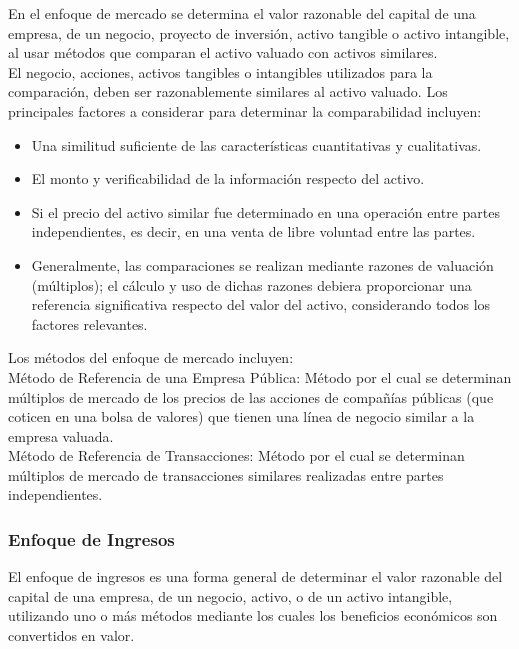 En el enfoque de mercado se determina el valor razonable del capital de una empresa, de un negocio, proyecto de inversi\'on, activo tangible o activo intangible, al usar m\'etodos que comparan el activo valuado con activos similares.\\[10pt]

El negocio, acciones, activos tangibles o intangibles utilizados para la comparaci\'on, deben ser razonablemente similares al activo valuado. Los principales factores a considerar para determinar la comparabilidad incluyen:\\[10pt]

\begin{itemize}

\item Una similitud suficiente de las caracter\'isticas cuantitativas y cualitativas.
\item El monto y verificabilidad de la informaci\'on respecto del activo.
\item Si el precio del activo similar fue determinado en una operaci\'on entre partes independientes, es decir, en una venta de libre voluntad entre las partes.
\item Generalmente, las comparaciones se realizan mediante razones de valuaci\'on (m\'ultiplos); el c\'alculo y uso de dichas razones debiera proporcionar una referencia significativa respecto del valor del activo, considerando todos los factores relevantes.
\end{itemize}

Los m\'etodos del enfoque de mercado incluyen:\\[10pt]

\textcolor{secundario}{M\'etodo de Referencia de una Empresa P\'ublica}: M\'etodo por el cual se determinan m\'ultiplos de mercado de los precios de las acciones de compa\~n\'ias p\'ublicas (que coticen en una bolsa de valores) que tienen una l\'inea de negocio similar a la empresa valuada.\\[10pt]

\textcolor{secundario}{M\'etodo de Referencia de Transacciones}: M\'etodo por el cual se determinan m\'ultiplos de mercado de transacciones similares realizadas entre partes independientes.

\subsubsection{Enfoque de Ingresos}

El enfoque de ingresos es una forma general de determinar el valor razonable del capital de una empresa, de un negocio, activo, o de un activo intangible, utilizando uno o m\'as m\'etodos mediante los cuales los beneficios econ\'omicos son convertidos en valor.\\[10pt]

